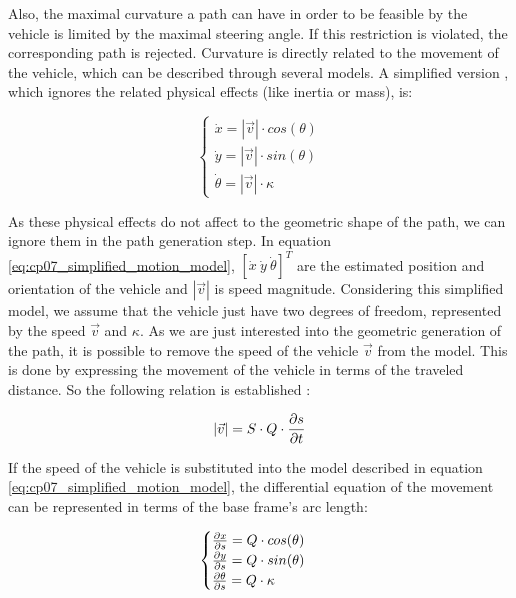 Also, the maximal curvature a path can have in order to be feasible by the vehicle is limited by the maximal steering angle. If this restriction is violated, the corresponding path is rejected. Curvature is directly related to the movement of the vehicle, which can be described through several models. A simplified version  \citep{chu2012local, barfoot2004motion}, which ignores the related physical effects (like inertia or mass), is:

\begin{equation}\label{eq:cp07_simplified_motion_model}
\begin{cases}
\dot{x} = |\vec{v}| \cdot cos(\theta) \\
\dot{y} = |\vec{v}| \cdot sin(\theta) \\
\dot{\theta} = |\vec{v}| \cdot \kappa
\end{cases}
\end{equation}

As these physical effects do not affect to the geometric shape of the path, we can ignore them in the path generation step. In equation \ref{eq:cp07_simplified_motion_model}, $[\dot{x} ~ \dot{y} ~ \dot{\theta} ]^T$ are the estimated position and orientation of the vehicle and $|\vec{v}|$ is speed magnitude. Considering this simplified model, we assume that the vehicle just have two degrees of freedom, represented by the speed $\vec{v}$ and $\kappa$. As we are just interested into the geometric generation of the path, it is possible to remove the speed of the vehicle $\vec{v}$ from the model. This is done by expressing the movement of the vehicle in terms of the traveled distance. So the following relation is established \citep{chu2012local}:

\begin{equation}\label{eq:cp07_speed_to_distance}
|\vec{v}| = S \cdot Q \cdot { {\partial s} \over {\partial t}}
\end{equation}

If the speed of the vehicle is substituted into the model described in equation \ref{eq:cp07_simplified_motion_model}, the differential equation of the movement can be represented in terms of the base frame's arc length:

\begin{equation}\label{eq:cp07_motion_model_in_distance_terms}
\begin{cases}
{{\partial x} \over {\partial s}} = Q \cdot cos(\theta) \\
{{\partial y} \over {\partial s}} = Q \cdot sin(\theta) \\
{{\partial \theta} \over {\partial s}} = Q \cdot \kappa
\end{cases}
\end{equation}


